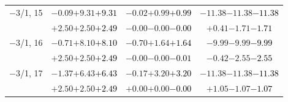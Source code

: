 \documentclass[compress]{beamer}
\begin{document}
\begin{frame}
\begin{tabular}{r | c | c | c}
$-$3/1, 15 & $-0.09$\hspace{0.1 cm}$+9.31$\hspace{0.1 cm}\textcolor{black}{$+9.31$} & $-0.02$\hspace{0.1 cm}$+0.99$\hspace{0.1 cm}\textcolor{black}{$+0.99$} & $-11.38$\hspace{0.1 cm}$-11.38$\hspace{0.1 cm}\textcolor{black}{$-11.38$} \\
           & $+2.50$\hspace{0.1 cm}$+2.50$\hspace{0.1 cm}\textcolor{black}{$+2.49$} & $-0.00$\hspace{0.1 cm}$-0.00$\hspace{0.1 cm}\textcolor{black}{$-0.00$} & $+0.41$\hspace{0.1 cm}$-1.71$\hspace{0.1 cm}\textcolor{black}{$-1.71$} \\
$-$3/1, 16 & $-0.71$\hspace{0.1 cm}$+8.10$\hspace{0.1 cm}\textcolor{black}{$+8.10$} & $-0.70$\hspace{0.1 cm}$+1.64$\hspace{0.1 cm}\textcolor{black}{$+1.64$} & $-9.99$\hspace{0.1 cm}$-9.99$\hspace{0.1 cm}\textcolor{black}{$-9.99$} \\
           & $+2.50$\hspace{0.1 cm}$+2.50$\hspace{0.1 cm}\textcolor{black}{$+2.49$} & $-0.00$\hspace{0.1 cm}$-0.00$\hspace{0.1 cm}\textcolor{black}{$-0.01$} & $-0.42$\hspace{0.1 cm}$-2.55$\hspace{0.1 cm}\textcolor{black}{$-2.55$} \\
$-$3/1, 17 & $-1.37$\hspace{0.1 cm}$+6.43$\hspace{0.1 cm}\textcolor{black}{$+6.43$} & $-0.17$\hspace{0.1 cm}$+3.20$\hspace{0.1 cm}\textcolor{black}{$+3.20$} & $-11.38$\hspace{0.1 cm}$-11.38$\hspace{0.1 cm}\textcolor{black}{$-11.38$} \\
           & $+2.50$\hspace{0.1 cm}$+2.50$\hspace{0.1 cm}\textcolor{black}{$+2.49$} & $+0.00$\hspace{0.1 cm}$+0.00$\hspace{0.1 cm}\textcolor{black}{$-0.00$} & $+1.05$\hspace{0.1 cm}$-1.07$\hspace{0.1 cm}\textcolor{black}{$-1.07$} \\

\end{tabular}
\end{frame}
\end{document}
